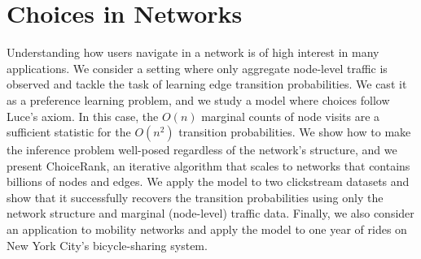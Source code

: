 \chapter{Choices in Networks}
\label{ch:choicerank}

Understanding how users navigate in a network is of high interest in many applications.
We consider a setting where only aggregate node-level traffic is observed and tackle the task of learning edge transition probabilities.
We cast it as a preference learning problem, and we study a model where choices follow Luce's axiom.
In this case, the $O(n)$ marginal counts of node visits are a sufficient statistic for the $O(n^2)$ transition probabilities.
We show how to make the inference problem well-posed regardless of the network's structure, and we present ChoiceRank, an iterative algorithm that scales to networks that contains billions of nodes and edges.
We apply the model to two clickstream datasets and show that it successfully recovers the transition probabilities using only the network structure and marginal (node-level) traffic data.
Finally, we also consider an application to mobility networks and apply the model to one year of rides on New York City's bicycle-sharing system.













